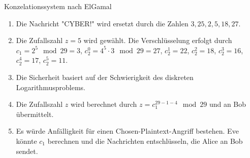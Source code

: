 \documentclass{article}
\begin{document}
\begin{exercise}{Konzelationssystem nach ElGamal}
  \begin{solution}
    \begin{enumerate}
        \item Die Nachricht "CYBER!" wird ersetzt durch die Zahlen $3, 25, 2, 5, 18, 27$.
        \item Die Zufallszahl $z=5$ wird gewählt. Die Verschlüsselung erfolgt durch $c_1=2^5 \mod{29}=3$, $c_2^0=4^5 \cdot 3 \mod{29}=27$, $c_2^1=22$, $c_2^2=18$, $c_2^3=16$, $c_2^4=17$, $c_2^5=11$.
        \item Die Sicherheit basiert auf der Schwierigkeit des diskreten Logarithmusproblems.
        \item Die Zufallszahl $z$ wird berechnet durch $z=c_1^{29-1-4} \mod{29}$ und an Bob übermittelt.
        \item Es würde Anfälligkeit für einen Chosen-Plaintext-Angriff bestehen. Eve könnte $c_1$ berechnen und die Nachrichten entschlüsseln, die Alice an Bob sendet.
    \end{enumerate}
  \end{solution}
\end{exercise}
\end{document}
